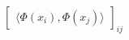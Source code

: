 \documentclass[preview]{standalone}
\begin{document}
\begin{align*}
\begin{bmatrix}\langle \Phi(x_i) , \Phi(x_j)\rangle\end{bmatrix}_{ij}
\end{align*}
\end{document}
